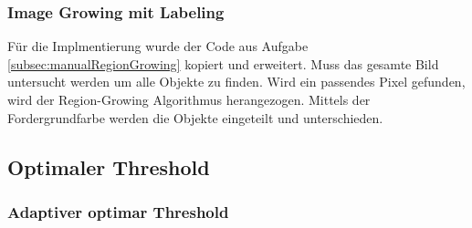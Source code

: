 \documentclass[12pt,german]{article}
\begin{document}
\begin{landscape}

\end{landscape}


\subsubsection{Image Growing mit Labeling}
Für die Implmentierung wurde der Code aus Aufgabe \ref{subsec:manualRegionGrowing} kopiert und erweitert. Muss das gesamte Bild untersucht werden um alle Objekte zu finden. Wird ein passendes Pixel gefunden, wird der Region-Growing Algorithmus herangezogen. Mittels der Fordergrundfarbe werden die Objekte eingeteilt und unterschieden.

\begin{landscape}

\end{landscape}


\subsection{Optimaler Threshold}






\subsubsection{Adaptiver optimar Threshold}




\end{document}
